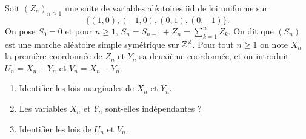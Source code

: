\documentclass[11pt]{td_um}
\begin{document}
\begin{exo}{} %
Soit $(Z_n)_{n\geq 1}$ une suite de variables aléatoires iid de loi uniforme sur 
$$\{(1,0),(-1,0),(0,1),(0,-1)\}.$$ 
On pose $S_0=0$ et pour $n\geq 1$, $S_n=S_{n-1}+Z_n=\sum_{k=1}^nZ_k$. On dit que $(S_n)$ est une marche aléatoire simple symétrique sur $\mathbb{Z}^2$. Pour tout $n\geq 1$ on note $X_n$ la première coordonnée de $Z_n$ et $Y_n$ sa deuxième coordonnée, et on introduit $U_n=X_n+Y_n$ et $V_n=X_n-Y_n$.
\begin{enumerate}
    \item Identifier les lois marginales de $X_n$ et $Y_n$.
    \item Les variables $X_n$ et $Y_n$ sont-elles indépendantes ?
    \item Identifier les lois de $U_n$ et $V_n$.
\end{enumerate}
\end{exo}
\end{document}
